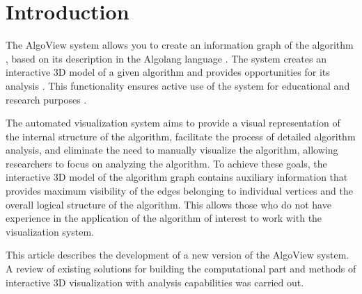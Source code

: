 \section{Introduction}

The AlgoView system allows you to create an information graph of the algorithm \cite{m1}, based on its description in the Algolang language \cite{m2}. The system creates an interactive 3D model of a given algorithm and provides opportunities for its analysis \cite{m3}. This functionality ensures active use of the system for educational and research purposes \cite{m4}.

The automated visualization system aims to provide a visual representation of the internal structure of the algorithm, facilitate the process of detailed algorithm analysis, and eliminate the need to manually visualize the algorithm, allowing researchers to focus on analyzing the algorithm. To achieve these goals, the interactive 3D model of the algorithm graph contains auxiliary information that provides maximum visibility of the edges belonging to individual vertices and the overall logical structure of the algorithm. This allows those who do not have experience in the application of the algorithm of interest to work with the visualization system.

This article describes the development of a new version of the AlgoView system. A review of existing solutions for building the computational part and methods of interactive 3D visualization with analysis capabilities was carried out.